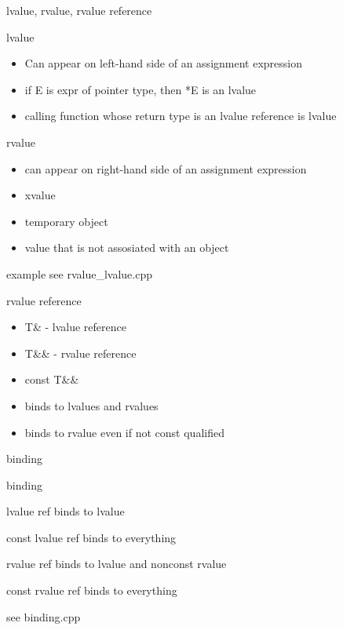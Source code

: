 \documentclass{beamer}
\begin{document}
\begin{frame}{lvalue, rvalue, rvalue reference}
  \begin{block}{lvalue}
    \begin{itemize}
    \item Can appear on left-hand side of an assignment expression
    \item if E is expr of pointer type, then *E is an lvalue
    \item calling function whose return type is an lvalue reference is lvalue
    \end{itemize}
  \end{block}

  \begin{block}{rvalue}
    \begin{itemize}
    \item can appear on right-hand side of an assignment expression
    \item xvalue
    \item temporary object
    \item value that is not assosiated with an object
    \end{itemize}
  \end{block}
\end{frame}

\begin{frame}{example}
  see rvalue\_lvalue.cpp
\end{frame}

\begin{frame}
  \begin{block}{rvalue reference}
    \begin{itemize}
    \item T\& - lvalue reference
    \item T\&\& - rvalue reference
    \item const T\&\&
    \item binds to lvalues and rvalues
    \item binds to rvalue even if not const qualified
    \end{itemize}
  \end{block}
\end{frame}

\begin{frame}{binding}
  \begin{block}{binding}
  \item lvalue ref binds to lvalue
  \item const lvalue ref binds to everything
  \item rvalue ref binds to lvalue and nonconst rvalue
  \item const rvalue ref binds to everything
  \end{block}
  see binding.cpp
\end{frame}
\end{document}
